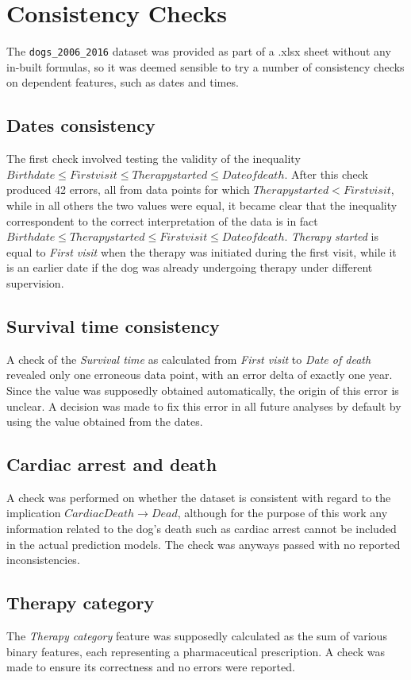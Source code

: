 \documentclass[12pt]{report}
\begin{document}
\section{Consistency Checks}
The \texttt{dogs\_2006\_2016} dataset was provided as part of a .xlsx sheet without any in-built formulas, so it was deemed sensible to try a number of consistency checks on dependent features, such as dates and times.
\subsection*{Dates consistency}
The first check involved testing the validity of the inequality $ Birth date \leq First visit \leq Therapy started \leq Date of death $. After this check produced 42 errors, all from data points for which $ Therapy started < First visit $, while in all others the two values were equal, it became clear that the inequality correspondent to the correct interpretation of the data is in fact $ Birth date \leq Therapy started \leq First visit \leq Date of death $. \textit{Therapy started} is equal to \textit{First visit} when the therapy was initiated during the first visit, while it is an earlier date if the dog was already undergoing therapy under different supervision.
\subsection*{Survival time consistency}
A check of the \textit{Survival time} as calculated from \textit{First visit} to \textit{Date of death} revealed only one erroneous data point, with an error delta of exactly one year. Since the value was supposedly obtained automatically, the origin of this error is unclear. A decision was made to fix this error in all future analyses by default by using the value obtained from the dates.
\subsection*{Cardiac arrest and death}
A check was performed on whether the dataset is consistent with regard to the implication $ CardiacDeath \rightarrow Dead $, although for the purpose of this work any information related to the dog's death such as cardiac arrest cannot be included in the actual prediction models. The check was anyways passed with no reported inconsistencies.
\subsection*{Therapy category}
The \textit{Therapy category} feature was supposedly calculated as the sum of various binary features, each representing a pharmaceutical prescription. A check was made to ensure its correctness and no errors were reported.
\end{document}
